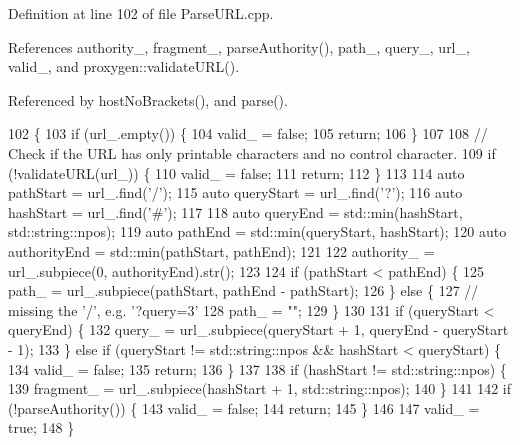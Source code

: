 Definition at line 102 of file Parse\+U\+R\+L.\+cpp.



References authority\+\_\+, fragment\+\_\+, parse\+Authority(), path\+\_\+, query\+\_\+, url\+\_\+, valid\+\_\+, and proxygen\+::validate\+U\+R\+L().



Referenced by host\+No\+Brackets(), and parse().


\begin{DoxyCode}
102                                       \{
103   \textcolor{keywordflow}{if} (url_.empty()) \{
104     valid_ = \textcolor{keyword}{false};
105     \textcolor{keywordflow}{return};
106   \}
107 
108   \textcolor{comment}{// Check if the URL has only printable characters and no control character.}
109   \textcolor{keywordflow}{if} (!validateURL(url_)) \{
110     valid_ = \textcolor{keyword}{false};
111     \textcolor{keywordflow}{return};
112   \}
113 
114   \textcolor{keyword}{auto} pathStart = url_.find(\textcolor{charliteral}{'/'});
115   \textcolor{keyword}{auto} queryStart = url_.find(\textcolor{charliteral}{'?'});
116   \textcolor{keyword}{auto} hashStart = url_.find(\textcolor{charliteral}{'#'});
117 
118   \textcolor{keyword}{auto} queryEnd = std::min(hashStart, std::string::npos);
119   \textcolor{keyword}{auto} pathEnd = std::min(queryStart, hashStart);
120   \textcolor{keyword}{auto} authorityEnd = std::min(pathStart, pathEnd);
121 
122   authority_ = url_.subpiece(0, authorityEnd).str();
123 
124   \textcolor{keywordflow}{if} (pathStart < pathEnd) \{
125     path_ = url_.subpiece(pathStart, pathEnd - pathStart);
126   \} \textcolor{keywordflow}{else} \{
127     \textcolor{comment}{// missing the '/', e.g. '?query=3'}
128     path_ = \textcolor{stringliteral}{""};
129   \}
130 
131   \textcolor{keywordflow}{if} (queryStart < queryEnd) \{
132     query_ = url_.subpiece(queryStart + 1, queryEnd - queryStart - 1);
133   \} \textcolor{keywordflow}{else} \textcolor{keywordflow}{if} (queryStart != std::string::npos && hashStart < queryStart) \{
134     valid_ = \textcolor{keyword}{false};
135     \textcolor{keywordflow}{return};
136   \}
137 
138   \textcolor{keywordflow}{if} (hashStart != std::string::npos) \{
139     fragment_ = url_.subpiece(hashStart + 1, std::string::npos);
140   \}
141 
142   \textcolor{keywordflow}{if} (!parseAuthority()) \{
143     valid_ = \textcolor{keyword}{false};
144     \textcolor{keywordflow}{return};
145   \}
146 
147   valid_ = \textcolor{keyword}{true};
148 \}
\end{DoxyCode}
